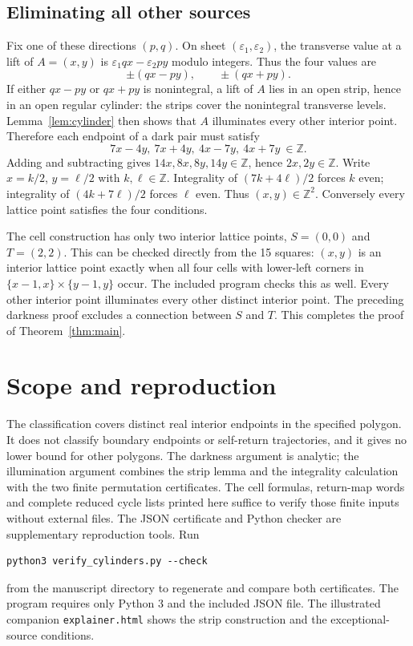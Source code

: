 \documentclass[11pt]{article}
\theoremstyle{remark}
\begin{document}
\subsection{Eliminating all other sources}\label{sec:eliminate}
Fix one of these directions $(p,q)$. On sheet $(\varepsilon_1,\varepsilon_2)$, the transverse value at a lift of $A=(x,y)$ is
$\varepsilon_1qx-\varepsilon_2py$ modulo integers. Thus the four values are
\[
 \pm(qx-py),\qquad \pm(qx+py).
\]
If either $qx-py$ or $qx+py$ is nonintegral, a lift of $A$ lies in an open strip, hence in an open regular
cylinder: the strips cover the nonintegral transverse levels.
Lemma~\ref{lem:cylinder} then shows that $A$ illuminates every other
interior point. Therefore each endpoint of a dark pair must satisfy
\[
 7x-4y,\ 7x+4y,\ 4x-7y,\ 4x+7y\ \in\mathbb Z.
\]
Adding and subtracting gives $14x,8x,8y,14y\in\mathbb Z$, hence
$2x,2y\in\mathbb Z$. Write $x=k/2$, $y=\ell/2$ with $k,\ell\in\mathbb Z$.
Integrality of $(7k+4\ell)/2$ forces $k$ even; integrality of $(4k+7\ell)/2$
forces $\ell$ even. Thus $(x,y)\in\mathbb Z^2$. Conversely every lattice point
satisfies the four conditions.

The cell construction has only two interior lattice points, $S=(0,0)$ and
$T=(2,2)$. This can be checked directly from the 15 squares: $(x,y)$ is an
interior lattice point exactly when all four cells with lower-left corners
in $\{x-1,x\}\times\{y-1,y\}$ occur. The included program checks this as well.
Every other interior point illuminates every other distinct interior point.
The preceding darkness proof excludes a connection between $S$ and $T$.
This completes the proof of Theorem~\ref{thm:main}.

\section{Scope and reproduction}
The classification covers distinct real interior endpoints in the specified
polygon. It does not classify boundary endpoints or self-return trajectories,
and it gives no lower bound for other polygons.
The darkness argument is analytic; the illumination argument combines the
strip lemma and the integrality calculation with the two finite permutation
certificates. The cell formulas, return-map words and complete reduced cycle
lists printed here suffice to verify those finite inputs without external
files. The JSON certificate and Python checker are supplementary
reproduction tools. Run
\begin{verbatim}
python3 verify_cylinders.py --check
\end{verbatim}
from the manuscript directory to regenerate and compare both certificates.
The program requires only Python 3 and the included JSON file.
The illustrated companion \texttt{explainer.html} shows the strip construction
and the exceptional-source conditions.
\end{document}
